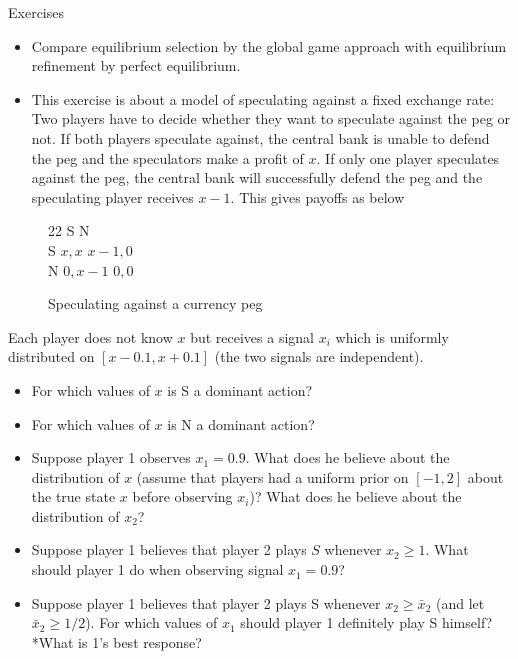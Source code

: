 \documentclass[bigger,allowframebreaks]{beamer}
\begin{document}
\begin{frame}[allowframebreaks,label=]{Exercises}

\begin{itemize}
\item Compare equilibrium selection by the global game approach with equilibrium refinement by perfect equilibrium.
\end{itemize}
\begin{itemize}
\item This exercise is about a model of speculating against a fixed exchange rate: Two players have to decide whether they want to speculate against the peg or not. If both players speculate against, the central bank is unable to defend the peg and the speculators make a profit of $x$. If only one player speculates against the peg, the central bank will successfully defend the peg and the speculating player receives $x-1$. This gives payoffs as below
\end{itemize}
\begin{figure}[h]
       \centering
      \begin{game}{2}{2}
             \>  S \> N\\
        S  \> $x,x$ \> $x-1,0$\\
       N   \> $0,x-1$ \> $0,0$
      \end{game}
     \caption{Speculating against a currency peg}
   \end{figure}
Each player does not know $x$ but receives a signal $x_i$ which is uniformly distributed on $[x-0.1,x+0.1]$ (the two signals are independent).
\begin{itemize}
\item For which values of $x$ is S a dominant action?
\item For which values of $x$ is N a dominant action?
\item Suppose player 1 observes $x_1=0.9$. What does he believe about the distribution of $x$ (assume that players had a uniform prior on $[-1,2]$ about the true state $x$ before observing $x_i$)? What does he believe about the distribution of $x_2$?
\end{itemize}
\begin{itemize}
\item Suppose player 1 believes that player 2 plays $S$ whenever $x_2\geq 1$. What should player 1 do when observing signal $x_1=0.9$?
\end{itemize}
\begin{itemize}
\item Suppose player 1 believes that player 2 plays S whenever $x_2\geq \bar x_2$ (and let $\bar x_2\geq 1/2$). For which values of $x_1$ should player 1 definitely play S himself? *What is 1's best response?

\end{itemize}
\end{frame}
\end{document}
